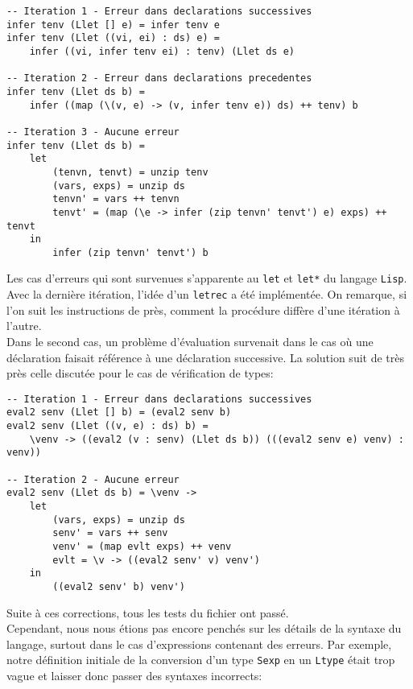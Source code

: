 \documentclass[11pt, titlepage]{article}
\begin{document}
\begin{lstlisting}
-- Iteration 1 - Erreur dans declarations successives
infer tenv (Llet [] e) = infer tenv e
infer tenv (Llet ((vi, ei) : ds) e) =
    infer ((vi, infer tenv ei) : tenv) (Llet ds e)

-- Iteration 2 - Erreur dans declarations precedentes
infer tenv (Llet ds b) =
    infer ((map (\(v, e) -> (v, infer tenv e)) ds) ++ tenv) b

-- Iteration 3 - Aucune erreur
infer tenv (Llet ds b) =
    let
        (tenvn, tenvt) = unzip tenv
        (vars, exps) = unzip ds
        tenvn' = vars ++ tenvn
        tenvt' = (map (\e -> infer (zip tenvn' tenvt') e) exps) ++ tenvt
    in
        infer (zip tenvn' tenvt') b
\end{lstlisting}
Les cas d'erreurs qui sont survenues s'apparente au \texttt{let} et
\texttt{let*} du langage \texttt{Lisp}. Avec la dernière itération, l'idée d'un
\texttt{letrec} a été implémentée. On remarque, si l'on suit les instructions
de près, comment la procédure diffère d'une itération à l'autre. \\

Dans le second cas, un problème d'évaluation survenait dans le cas où une
déclaration faisait référence à une déclaration successive. La solution suit de
très près celle discutée pour le cas de vérification de types:

\begin{lstlisting}
-- Iteration 1 - Erreur dans declarations successives
eval2 senv (Llet [] b) = (eval2 senv b)
eval2 senv (Llet ((v, e) : ds) b) =
    \venv -> ((eval2 (v : senv) (Llet ds b)) (((eval2 senv e) venv) : venv))

-- Iteration 2 - Aucune erreur
eval2 senv (Llet ds b) = \venv ->
    let
        (vars, exps) = unzip ds
        senv' = vars ++ senv
        venv' = (map evlt exps) ++ venv
        evlt = \v -> ((eval2 senv' v) venv')
    in
        ((eval2 senv' b) venv')
\end{lstlisting}
Suite à ces corrections, tous les tests du fichier ont passé. \\

Cependant, nous nous étions pas encore penchés sur les détails de la syntaxe du
langage, surtout dans le cas d'expressions contenant des erreurs. Par exemple,
notre définition initiale de la conversion d'un type \texttt{Sexp} en un
\texttt{Ltype} était trop vague et laisser donc passer des syntaxes incorrects:
\end{document}
